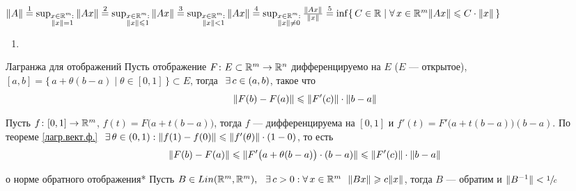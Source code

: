 \begin{zam}[https://youtu.be/OazzLm0DJN4?si=gixxNia3dTgatT7R&t=3022]
	$\|A\| \stackrel{1}{=} \sup_{\substack{x \in \rmm: \\ \|x\| = 1}}\|Ax\|
	\stackrel{2}{=} \sup_{\substack{x \in \rmm: \\ \|x\| \< 1}}\|Ax\| 
	\stackrel{3}{=} \sup_{\substack{x \in \rmm: \\ \|x\| < 1}}\|Ax\| 
	\stackrel{4}{=} \sup_{\substack{x \in \rmm: \\ \|x\| \ne 0}} \frac{\|Ax\|}{\|x\|} \medskip 
	\stackrel{5}{=} \inf\{\,C\in \rr \mid \A x \in \rmm \|Ax\| \< C \cdot \|x\|\,\}$ 
	\begin{enumerate}
		\item
	\end{enumerate}
\end{zam}

\begin{teor}[https://youtu.be/OazzLm0DJN4?si=JvVhDSiKtEYa2cTH&t=3281]{Лагранжа для отображений}\label{теор.лагрнж.для отобр.}%
	Пусть отображение $F \colon E \subset \mathbb R^m \to \mathbb R^n$ дифференцируемо на $E$ ($E$ --- открытое), $[a, b] = \{\, a + \theta (b - a)\mid \theta \in [0, 1]\,\} \subset E$, тогда$\E c \in (a, b)$,  такое что
	\[\|F(b) - F(a)\| \leqslant \|F'(c)\| \cdot \|b - a\|\] 
\end{teor}           

\begin{prf}
	Пусть $f \colon [0, 1] \to \mathbb R^m$, $f(t) = F\bigl(a + t(b - a)\bigr)$, тогда $f$ --- дифференцируема \smallskip на $[0, 1]$ и $f'(t) = F'\bigl(a + t(b-a)\bigr)(b - a)$. По теореме \ref{лагр.вект.ф.}$\hspace{7pt plus 1pt minus 2pt} \exists \, \theta \in (0, 1) : \|f(1) - f(0)\| \leqslant \|f'(\theta)\| \cdot (1 - 0)$, {то есть\linebreak} \[\|F(b) - F(a)\| \leqslant \|F'\bigl(a + \theta(b - a)\bigr)\cdot (b - a)\| \leqslant \|F'(c)\|\cdot\|b - a\| \] 
\end{prf}


\begin{lem}[https://youtu.be/OazzLm0DJN4?si=OJoKFMQENlqrOntk&t=3846]{о норме обратного отображения}*\label{лем.усл.экв.непр.лин.оп.}
	Пусть $B \in Lin(\mathbb R^m, \mathbb R^m), \hspace{7pt plus 1pt minus 2pt} \exists \, c > 0 : \forall \, x \in \mathbb R^m\ \ \|Bx\| \geqslant c\|x\|$, тогда $B$ --- обратим и $\|B^{-1}\|< \sfrac{1}{c}$
\end{lem}

